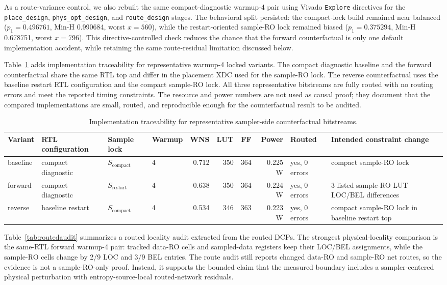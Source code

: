 \documentclass[journal]{IEEEtran}
\newcommand{\scompact}{$S_\mathrm{compact}$}
\newcommand{\srestart}{$S_\mathrm{restart}$}
\begin{document}
As a route-variance control, we also rebuilt the same compact-diagnostic warmup-4 pair using Vivado \texttt{Explore} directives for the \texttt{place\_design}, \texttt{phys\_opt\_design}, and \texttt{route\_design} stages. The behavioral split persisted: the compact-lock build remained near balanced ($p_1=0.496761$, Min-H 0.990684, worst $x=560$), while the restart-oriented sample-RO lock remained biased ($p_1=0.375294$, Min-H 0.678751, worst $x=796$). This directive-controlled check reduces the chance that the forward counterfactual is only one default implementation accident, while retaining the same route-residual limitation discussed below.

Table~\ref{tab:implsummary} adds implementation traceability for representative warmup-4 locked variants. The compact diagnostic baseline and the forward counterfactual share the same RTL top and differ in the placement XDC used for the sample-RO lock. The reverse counterfactual uses the baseline restart RTL configuration and the compact sample-RO lock. All three representative bitstreams are fully routed with no routing errors and meet the reported timing constraints. The resource and power numbers are not used as causal proof; they document that the compared implementations are small, routed, and reproducible enough for the counterfactual result to be audited.

\begin{table}[t]
\centering
\caption{Implementation traceability for representative sampler-side counterfactual bitstreams.}
\label{tab:implsummary}
\scriptsize
\begin{tabular}{llllrrrrll}
\toprule
Variant & RTL configuration & Sample lock & Warmup & WNS & LUT & FF & Power & Routed & Intended constraint change \\
\midrule
baseline & compact diagnostic & \scompact{} & 4 & 0.712 & 350 & 364 & 0.225 W & yes, 0 errors & compact sample-RO lock \\
forward & compact diagnostic & \srestart{} & 4 & 0.638 & 350 & 364 & 0.224 W & yes, 0 errors & 3 listed sample-RO LUT LOC/BEL differences \\
reverse & baseline restart & \scompact{} & 4 & 0.534 & 346 & 363 & 0.223 W & yes, 0 errors & compact sample-RO lock in baseline restart top \\
\bottomrule
\end{tabular}
\end{table}

Table~\ref{tab:routedaudit} summarizes a routed locality audit extracted from the routed DCPs. The strongest physical-locality comparison is the same-RTL forward warmup-4 pair: tracked data-RO cells and sampled-data registers keep their LOC/BEL assignments, while the sample-RO cells change by 2/9 LOC and 3/9 BEL entries. The route audit still reports changed data-RO and sample-RO net routes, so the evidence is not a sample-RO-only proof. Instead, it supports the bounded claim that the measured boundary includes a sampler-centered physical perturbation with entropy-source-local routed-network residuals.
\end{document}
